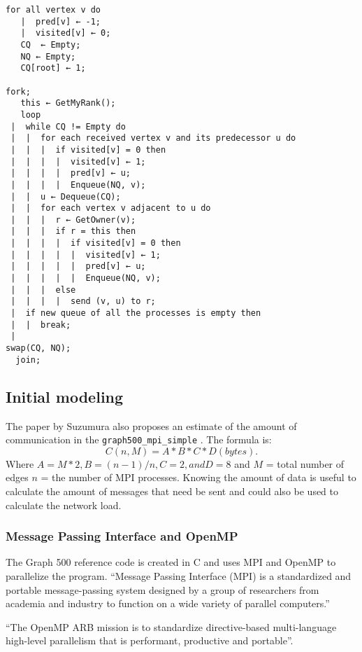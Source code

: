 \begin{lstlisting}[label={code:pseudo-simple},caption={Pseudo code taken from paper \cite{suzumura2011performance}}]
for all vertex v do 
   |  pred[v] ← -1; 
   |  visited[v] ← 0; 
   CQ  ← Empty; 
   NQ ← Empty; 
   CQ[root] ← 1; 
   
fork;
   this ← GetMyRank(); 
   loop 
 |  while CQ != Empty do 
 |  |  for each received vertex v and its predecessor u do 
 |  |  |  if visited[v] = 0 then 
 |  |  |  |  visited[v] ← 1; 
 |  |  |  |  pred[v] ← u; 
 |  |  |  |  Enqueue(NQ, v); 
 |  |  u ← Dequeue(CQ); 
 |  |  for each vertex v adjacent to u do 
 |  |  |  r ← GetOwner(v); 
 |  |  |  if r = this then 
 |  |  |  |  if visited[v] = 0 then 
 |  |  |  |  |  visited[v] ← 1; 
 |  |  |  |  |  pred[v] ← u; 
 |  |  |  |  |  Enqueue(NQ, v); 
 |  |  |  else 
 |  |  |  |  send (v, u) to r; 
 |  if new queue of all the processes is empty then 
 |  |  break; 
 |  
swap(CQ, NQ); 
  join;
\end{lstlisting}
 

\subsection*{Initial modeling}
The paper by Suzumura \cite{suzumura2011performance} also proposes an estimate of the amount of communication in the \texttt{graph500\_mpi\_simple} . The formula is:
\begin{equation}
\label{eq:communication_size}
C(n, M) = A * B * C * D (bytes).
\end{equation}
Where $A = M*2, B = (n-1)/n, C=2, and D=8$ and $M$ = total number of edges $n$ = the number of MPI processes.
Knowing the amount of data is useful to calculate the amount of messages that need be sent and could also be used to calculate the network load.

\subsubsection{Message Passing Interface and OpenMP}
\label{mpiopenmp}
The Graph 500 reference code is created in C and uses MPI and OpenMP to parallelize the program.
``Message Passing Interface (MPI) is a standardized and portable message-passing system designed by a group of researchers from academia and industry to function on a wide variety of parallel computers.\cite{mpi}''

``The OpenMP ARB mission is to standardize directive-based multi-language high-level parallelism that is performant, productive and portable''\cite{openmp}.



